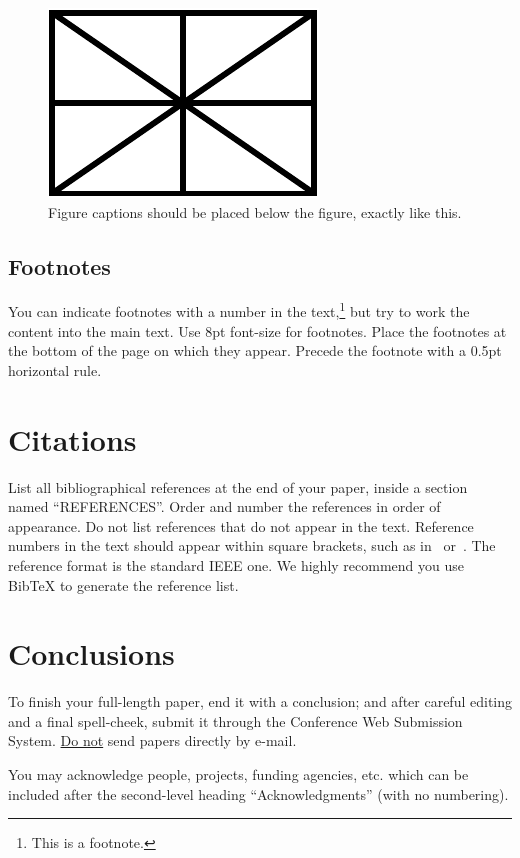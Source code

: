 \documentclass{article}
\begin{document}
\begin{figure}[t]
\centering
\includegraphics[width=0.6\columnwidth]{figure}
\caption{Figure captions should be placed below the figure, 
exactly like this.\label{fig:example}}
\end{figure}


\subsection{Footnotes}
You can indicate footnotes with a number in the text,\footnote{This is a footnote.}
but try to work the content into the main text.
Use 8pt font-size for footnotes. 
Place the footnotes at the bottom of the page 
on which they appear. 
Precede the footnote with a 0.5pt horizontal rule.

\section{Citations}
List all bibliographical references at the end of your paper,
inside a section named ``REFERENCES''.
Order and number the references in order of appearance. 
Do not list references that do not appear in the text.
Reference numbers in the text should appear within square brackets, such as 
in~\cite{Someone:00} or~\cite{Someone:00,Someone:04,Someone:09}.
The reference format is the standard IEEE one. 
We highly recommend you use BibTeX 
to generate the reference list.

\section{Conclusions}
To finish your full-length paper, end it with a conclusion;
and after careful editing and a final spell-cheek,
submit it through the Conference Web Submission System. 
\underline{Do not} send papers directly by e-mail.
%
\begin{acknowledgments}
You may acknowledge people, projects, 
funding agencies, etc. 
which can be included after the second-level heading
``Acknowledgments'' (with no numbering).
\end{acknowledgments} 


\end{document}
